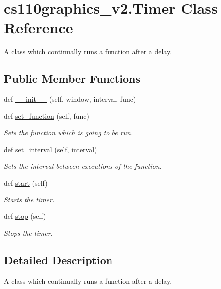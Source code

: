 \hypertarget{classcs110graphics__v2_1_1Timer}{}\section{cs110graphics\+\_\+v2.\+Timer Class Reference}
\label{classcs110graphics__v2_1_1Timer}


A class which continually runs a function after a delay.  


\subsection*{Public Member Functions}
\begin{DoxyCompactItemize}
\item 
def \mbox{\hyperlink{classcs110graphics__v2_1_1Timer_a0f6c5ff3f26495595f948d8b7b6e1a55}{\+\_\+\+\_\+init\+\_\+\+\_\+}} (self, window, interval, func)
\item 
def \mbox{\hyperlink{classcs110graphics__v2_1_1Timer_a6702eb2eb53818a3e00689010f43f30b}{set\+\_\+function}} (self, func)
\begin{DoxyCompactList}\small\item\em Sets the function which is going to be run. \end{DoxyCompactList}\item 
def \mbox{\hyperlink{classcs110graphics__v2_1_1Timer_aca592991da63df981ee063c562e67ecc}{set\+\_\+interval}} (self, interval)
\begin{DoxyCompactList}\small\item\em Sets the interval between executions of the function. \end{DoxyCompactList}\item 
def \mbox{\hyperlink{classcs110graphics__v2_1_1Timer_aac77d9e79633fa405ce7ae0ed09c99fb}{start}} (self)
\begin{DoxyCompactList}\small\item\em Starts the timer. \end{DoxyCompactList}\item 
def \mbox{\hyperlink{classcs110graphics__v2_1_1Timer_af622ebf43ed79a27f0ce0c5e6d316a62}{stop}} (self)
\begin{DoxyCompactList}\small\item\em Stops the timer. \end{DoxyCompactList}\end{DoxyCompactItemize}


\subsection{Detailed Description}
A class which continually runs a function after a delay. 



